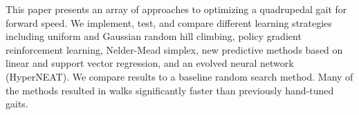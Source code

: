 
This paper presents an array of approaches to optimizing a quadrupedal
gait for forward speed.  We implement, test, and compare different
learning strategies including uniform and Gaussian random hill
climbing, policy gradient reinforcement learning\cite{kohl},
Nelder-Mead simplex\cite{nm}, new predictive methods based on linear
and support vector regression, and an evolved neural network
(HyperNEAT)\cite{clune}.  We compare results to a baseline random
search method.  Many of the methods resulted in walks significantly
faster than previously hand-tuned gaits.

